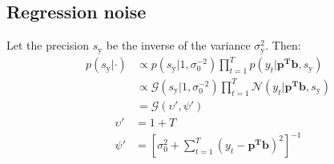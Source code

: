 \documentclass[smallextended]{svjour3}          %
\begin{document}
\subsection{Regression noise}
Let the precision $s_{\text{y}}$ be the inverse of the variance $\sigma_{\text{y}}^{2}$. Then:
\begin{align*}
p(s_{\text{y}} | \cdot) &\propto
p(s_{\text{y}} | 1,\sigma_{0}^{-2}) \prod_{t=1}^T p(y_t | \mathbf{p^T b}, s_{\text{y}})\\
&\propto \mathcal{G}(s_{\text{y}} | 1,\sigma_{\text{0}}^{-2}) \prod_{t=1}^T \mathcal{N}( y_t | \mathbf{p^T b}, s_{\text{y}})\\
&= \mathcal{G}(\upsilon', \psi')  
\end{align*}
\begin{align*}
\upsilon' &= 1+T\\ 
\psi' &= \left[\sigma_{\text{0}}^{2} + \sum_{t=1}^{T}\left(y_t-\mathbf{p^Tb}\right)^2\right]^{-1}
\end{align*}


\end{document}
